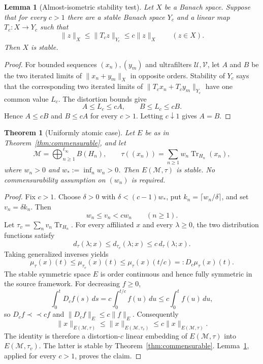 \documentclass[11pt]{amsart}
\newtheorem{theorem}{Theorem}
\newtheorem{lemma}{Lemma}
\newcommand{\M}{\mathcal M}
\newcommand{\Tr}{\operatorname{Tr}}
\begin{document}
\begin{lemma}[Almost-isometric stability test]\label{lem:almost}
Let $X$ be a Banach space.  Suppose that for every $c>1$ there are a stable
Banach space $Y_c$ and a linear map $T_c:X\to Y_c$ such that
\[
 \|z\|_X\leq\|T_cz\|_{Y_c}\leq c\|z\|_X
 \qquad(z\in X).
\]
Then $X$ is stable.
\end{lemma}

\begin{proof}
For bounded sequences $(x_n),(y_m)$ and ultrafilters $\mathcal U,\mathcal V$,
let $A$ and $B$ be the two iterated limits of $\|x_n+y_m\|_X$ in opposite
orders.  Stability of $Y_c$ says that the corresponding two iterated limits of
$\|T_cx_n+T_cy_m\|_{Y_c}$ have one common value $L_c$.  The distortion bounds
give
\[
 A\leq L_c\leq cA,
 \qquad B\leq L_c\leq cB.
\]
Hence $A\leq cB$ and $B\leq cA$ for every $c>1$.  Letting $c\downarrow1$
gives $A=B$.
\end{proof}

\begin{theorem}[Uniformly atomic case]\label{thm:uniform}
Let $E$ be as in Theorem~\ref{thm:commensurable}, and let
\[
 \M=\mathop{\bigoplus}^{\ell_\infty}_{n\geq1}B(H_n),
 \qquad
 \tau((x_n))=\sum_{n\geq1}w_n\Tr_{H_n}(x_n),
\]
where $w_n>0$ and $w_*:=\inf_n w_n>0$.  Then $E(\M,\tau)$ is stable.  No
commensurability assumption on $(w_n)$ is required.
\end{theorem}

\begin{proof}
Fix $c>1$.  Choose $\delta>0$ with $\delta<(c-1)w_*$, put
$k_n=\lceil w_n/\delta\rceil$, and set $v_n=\delta k_n$.  Then
\[
 w_n\leq v_n<cw_n\qquad(n\geq1).
\]
Let $\tau_v=\sum_n v_n\Tr_{H_n}$.  For every affiliated $x$ and every
$\lambda\geq0$, the two distribution functions satisfy
\[
 d_{\tau}(\lambda;x)\leq d_{\tau_v}(\lambda;x)
 \leq c\,d_{\tau}(\lambda;x).
\]
Taking generalized inverses yields
\[
 \mu_\tau(x)(t)\leq\mu_{\tau_v}(x)(t)
 \leq \mu_\tau(x)(t/c)=:D_c\mu_\tau(x)(t).
\]
The stable symmetric space $E$ is order continuous and hence fully symmetric
in the source framework.  For decreasing $f\geq0$,
\[
 \int_0^tD_cf(s)\,ds
 =c\int_0^{t/c}f(u)\,du
 \leq c\int_0^t f(u)\,du,
\]
so $D_cf\prec\!\prec cf$ and $\|D_cf\|_E\leq c\|f\|_E$.  Consequently
\[
 \|x\|_{E(\M,\tau)}
 \leq\|x\|_{E(\M,\tau_v)}
 \leq c\|x\|_{E(\M,\tau)}.
\]
The identity is therefore a distortion-$c$ linear embedding of
$E(\M,\tau)$ into $E(\M,\tau_v)$.  The latter is stable by
Theorem~\ref{thm:commensurable}.  Lemma~\ref{lem:almost}, applied for every
$c>1$, proves the claim.
\end{proof}
\end{document}
